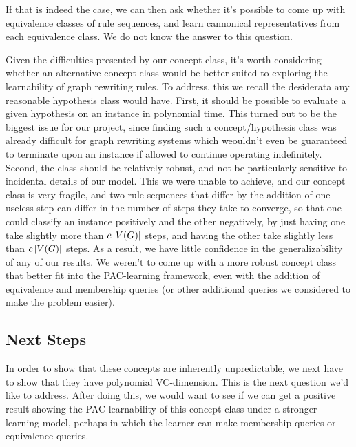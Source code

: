 \documentclass[]{article}
\begin{document}
If that is indeed the case, we can then ask whether it's possible to come up
with equivalence classes of rule sequences, and learn cannonical representatives
from each equivalence class. We do not know the answer to this question.

Given the difficulties presented by our concept class, it's worth considering
whether an alternative concept class would be better suited to exploring the
learnability of graph rewriting rules. To address, this we recall the desiderata
any reasonable hypothesis class would have. First, it should be possible to
evaluate a given hypothesis on an instance in polynomial time. This turned out
to be the biggest issue for our project, since finding such a concept/hypothesis
class was already difficult for graph rewriting systems which weouldn't even be
guaranteed to terminate upon an instance if allowed to continue operating
indefinitely. Second, the class should be relatively robust, and not be
particularly sensitive to incidental details of our model. This we were unable
to achieve, and our concept class is very fragile, and two rule sequences that
differ by the addition of one useless step can differ in the number of steps
they take to converge, so that one could classify an instance positively and the
other negatively, by just having one take slightly more than $c\left| V(G) \right|$
steps, and having the other take slightly less than $c\left| V(G) \right|$ steps. As a
result, we have little confidence in the generalizability of any of our results.
We weren't to come up with a more robust concept class that better fit into the
PAC-learning framework, even with the addition of equivalence and membership
queries (or other additional queries we considered to make the problem easier).

\subsection{Next Steps}

In order to show that these concepts are inherently unpredictable, we next have
to show that they have polynomial VC-dimension. This is the next question we'd
like to address. After doing this, we would want to see if we can get a positive
result showing the PAC-learnability of this concept class under a stronger
learning model, perhaps in which the learner can make membership queries or
equivalence queries.




\end{document}
